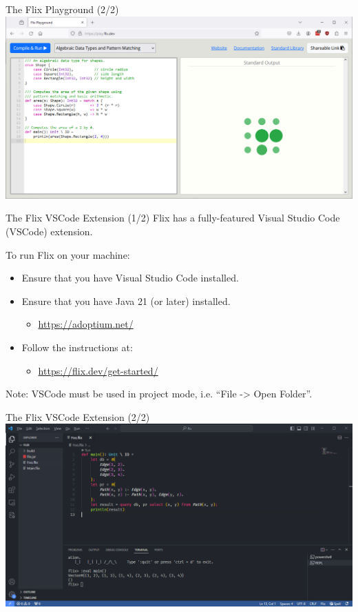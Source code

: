 \begin{frame}{The Flix Playground (2/2)}
\includegraphics[width=\textwidth]{img/flix-playground.png}
\end{frame}

\begin{frame}{The Flix VSCode Extension (1/2)}
Flix has a fully-featured Visual Studio Code (VSCode) extension. 

To run Flix on your machine:
\begin{itemize}
    \item Ensure that you have Visual Studio Code installed.
    \item Ensure that you have Java 21 (or later) installed.
    \begin{itemize}
        \item \url{https://adoptium.net/}
    \end{itemize}
    \item Follow the instructions at:
    \begin{itemize}
        \item \url{https://flix.dev/get-started/}
    \end{itemize}
\end{itemize}

{\small Note: VSCode must be used in project mode, i.e. ``File -> Open Folder''.}
\end{frame}

\begin{frame}{The Flix VSCode Extension (2/2)}
\includegraphics[width=\textwidth]{img/flix-vscode.png}
\end{frame}
    
